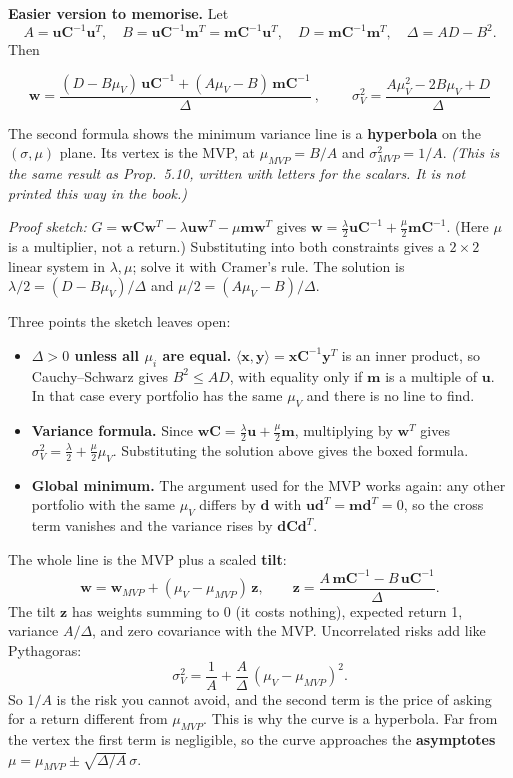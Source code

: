 \documentclass[titlepage,11pt,a4paper]{article}
\newcommand{\vw}{\boldsymbol{w}}
\newcommand{\vm}{\boldsymbol{m}}
\newcommand{\vu}{\boldsymbol{u}}
\newcommand{\vC}{\boldsymbol{C}}
\newcommand{\T}{^{T}}
\newcommand{\Ci}{\vC^{-1}}
\begin{document}
\textbf{Easier version to memorise.} Let
\[A=\vu\Ci\vu\T,\quad B=\vu\Ci\vm\T=\vm\Ci\vu\T,\quad D=\vm\Ci\vm\T,\quad \Delta=AD-B^2.\]
Then
\begin{result}
\[\boxed{\ \vw=\frac{(D-B\mu_V)\,\vu\Ci+(A\mu_V-B)\,\vm\Ci}{\Delta}\ },\qquad \boxed{\ \sigma_V^2=\frac{A\mu_V^2-2B\mu_V+D}{\Delta}\ }\]
\end{result}
The second formula shows the minimum variance line is a \textbf{hyperbola} on the $(\sigma,\mu)$ plane. Its vertex is the MVP, at $\mu_{MVP}=B/A$ and $\sigma^2_{MVP}=1/A$.
\emph{(This is the same result as Prop.\ 5.10, written with letters for the scalars. It is not printed this way in the book.)}

\emph{Proof sketch:} $G=\vw\vC\vw\T-\lambda\vu\vw\T-\mu\vm\vw\T$ gives $\vw=\tfrac\lambda2\vu\Ci+\tfrac\mu2\vm\Ci$. (Here $\mu$ is a multiplier, not a return.) Substituting into both constraints gives a $2\times2$ linear system in $\lambda,\mu$; solve it with Cramer's rule. The solution is $\lambda/2=(D-B\mu_V)/\Delta$ and $\mu/2=(A\mu_V-B)/\Delta$.

Three points the sketch leaves open:
\begin{itemize}
  \item \textbf{$\Delta>0$ unless all $\mu_i$ are equal.} $\langle\boldsymbol x,\boldsymbol y\rangle=\boldsymbol x\Ci\boldsymbol y\T$ is an inner product, so Cauchy--Schwarz gives $B^2\le AD$, with equality only if $\vm$ is a multiple of $\vu$. In that case every portfolio has the same $\mu_V$ and there is no line to find.
  \item \textbf{Variance formula.} Since $\vw\vC=\tfrac\lambda2\vu+\tfrac\mu2\vm$, multiplying by $\vw\T$ gives $\sigma_V^2=\tfrac\lambda2+\tfrac\mu2\mu_V$. Substituting the solution above gives the boxed formula.
  \item \textbf{Global minimum.} The argument used for the MVP works again: any other portfolio with the same $\mu_V$ differs by $\boldsymbol d$ with $\vu\boldsymbol d\T=\vm\boldsymbol d\T=0$, so the cross term vanishes and the variance rises by $\boldsymbol d\vC\boldsymbol d\T$.
\end{itemize}

\begin{intuition}
The whole line is the MVP plus a scaled \textbf{tilt}:
\[\vw=\vw_{MVP}+(\mu_V-\mu_{MVP})\,\boldsymbol z,\qquad \boldsymbol z=\frac{A\,\vm\Ci-B\,\vu\Ci}{\Delta}.\]
The tilt $\boldsymbol z$ has weights summing to 0 (it costs nothing), expected return 1, variance $A/\Delta$, and zero covariance with the MVP. Uncorrelated risks add like Pythagoras:
\[\sigma_V^2=\frac1A+\frac A\Delta\,(\mu_V-\mu_{MVP})^2.\]
So $1/A$ is the risk you cannot avoid, and the second term is the price of asking for a return different from $\mu_{MVP}$. This is why the curve is a hyperbola. Far from the vertex the first term is negligible, so the curve approaches the \textbf{asymptotes} $\mu=\mu_{MVP}\pm\sqrt{\Delta/A}\,\sigma$.
\end{intuition}
\end{document}
